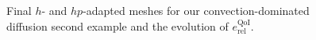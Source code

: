 \begin{figure}
  \caption{Final $h$- and $hp$-adapted meshes for our convection-dominated diffusion second example and the evolution of $e_{\textrm{rel}}^{\textrm{QoI}}$.}
  \label{fig:ConvDiff2DGOAmesh}
\end{figure}

%
%
%
%
%
